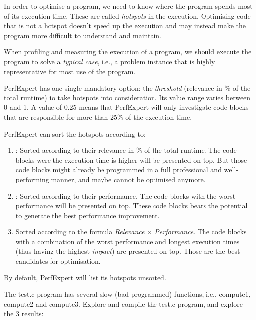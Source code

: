 In order to optimise a program, we need to know where the program spends most of its execution time. These are called \emph{hotspots} in the execution. Optimising code that is not a hotspot doesn't speed up the execution and may instead make the program more difficult to understand and maintain.

When profiling and measuring the execution of a program, we should execute the program to solve a \emph{typical case}, i.e., a problem instance that is highly representative for most use of the program.

PerfExpert has one single mandatory option: the \emph{threshold} (relevance in \% of the total runtime) to take hotspots into consideration. Its value range varies between 0 and 1. A value of 0.25 means that PerfExpert will only investigate code blocks that are responsible for more than 25\% of the execution time.

PerfExpert can sort the hotspots according to:

\begin{enumerate}
  \item  {}: Sorted according to their relevance in \% of the total runtime. The code blocks were the execution time is higher will be presented on top. But those code blocks might already be programmed in a full professional and well-performing manner, and maybe cannot be optimised anymore.
  \item  {}: Sorted according to their performance. The code blocks with the worst performance will be presented on top. These code blocks bears the potential to generate the best performance improvement.
  \item  {} Sorted according to the formula \emph{Relevance $\times$ Performance}. The code blocks with a combination of the worst performance and longest execution times (thus having the highest \emph{impact}) are presented on top. Those are the best candidates for optimisation.
\end{enumerate}

By default, PerfExpert will list its hotspots unsorted.

The test.c program has several slow (bad programmed) functions, i.e., compute1, compute2 and compute3. Explore and compile the test.c program, and explore the 3 results:

\begin{prompt}
\end{prompt}

